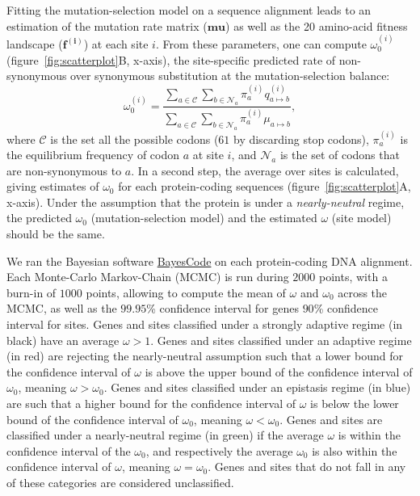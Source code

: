 \documentclass{article}
\newcommand{\UniDimArray}[1]{\bm{#1}}
\begin{document}
Fitting the mutation-selection model on a sequence alignment leads to an estimation of the mutation rate matrix ($\UniDimArray{mu}$) as well as the 20 amino-acid fitness landscape ($\UniDimArray{f^{(i)}}$) at each site $i$.
From these parameters, one can compute $\omega_{0}^{(i)}$ (figure~\ref{fig:scatterplot}B, x-axis), the site-specific predicted rate of non-synonymous over synonymous substitution at the mutation-selection balance:
\begin{equation}
	\omega_{0}^{(i)} = \dfrac{\sum_{a \in \mathcal{C}} \sum_{b \in \mathcal{N}_a} \pi_a^{(i)} q_{a \mapsto b}^{(i)}}{\sum_{a \in \mathcal{C}} \sum_{b \in \mathcal{N}_a} \pi_a^{(i)} \mu_{a \mapsto b}},
\end{equation}
where $\mathcal{C}$ is the set all the possible codons ($61$ by discarding stop codons), $\pi_a^{(i)}$ is the equilibrium frequency of codon $a$ at site $i$, and $\mathcal{N}_a$ is the set of codons that are non-synonymous to $a$\cite{spielman_relationship_2015, rodrigue_detecting_2016}.
In a second step, the average over sites is calculated, giving estimates of $\omega_{0}$ for each protein-coding sequences (figure~\ref{fig:scatterplot}A, x-axis).
Under the assumption that the protein is under a \textit{nearly-neutral} regime, the predicted $\omega_{0}$ (mutation-selection model) and the estimated $\omega$ (site model) should be the same\cite{spielman_relationship_2015}.

We ran the Bayesian software \href{https://github.com/bayesiancook/bayescode}{BayesCode} on each protein-coding DNA alignment\cite{lartillot_phylobayes_2013, rodrigue_detecting_2016}.
Each Monte-Carlo Markov-Chain (MCMC) is run during $2000$ points, with a burn-in of $1000$ points, allowing to compute the mean of $\omega$ and $\omega_{0}$ across the MCMC, as well as the $99.95$\% confidence interval for genes $90$\% confidence interval for sites.
Genes and sites classified under a strongly adaptive regime (in black) have an average $\omega > 1$.
Genes and sites classified under an adaptive regime (in red) are rejecting the nearly-neutral assumption such that a lower bound for the confidence interval of $\omega$ is above the upper bound of the confidence interval of $\omega_{0}$, meaning $\omega > \omega_{0}$.
Genes and sites classified under an epistasis regime (in blue) are such that a higher bound for the confidence interval of $\omega$ is below the lower bound of the confidence interval of $\omega_{0}$, meaning $\omega < \omega_{0}$.
Genes and sites are classified under a nearly-neutral regime (in green) if the average $\omega$ is within the confidence interval of the $\omega_{0}$, and respectively the average $\omega_{0}$ is also within the confidence interval of  $\omega$, meaning $\omega = \omega_{0}$.
Genes and sites that do not fall in any of these categories are considered unclassified.
\end{document}
